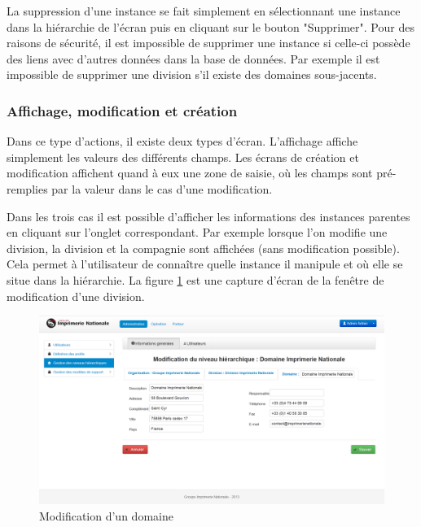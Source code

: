 La suppression d'une instance se fait simplement en sélectionnant une instance dans la hiérarchie de l'écran puis en cliquant sur le bouton "Supprimer".
Pour des raisons de sécurité, il est impossible de supprimer une instance si celle-ci possède des liens avec d'autres données dans la base de données.
Par exemple il est impossible de supprimer une division s'il existe des domaines sous-jacents.


\subsubsection{Affichage, modification et création}

Dans ce type d'actions, il existe deux types d'écran.
L'affichage affiche simplement les valeurs des différents champs.
Les écrans de création et modification affichent quand à eux une zone de saisie, où les champs sont pré-remplies par la valeur dans le cas d'une modification.

Dans les trois cas il est possible d'afficher les informations des instances parentes en cliquant sur l'onglet correspondant.
Par exemple lorsque l'on modifie une division, la division et la compagnie sont affichées (sans modification possible).
Cela permet à l'utilisateur de connaître quelle instance il manipule et où elle se situe dans la hiérarchie.
La figure \ref{instances_modification} est une capture d'écran de la fenêtre de modification d'une division.
\begin{figure}[!h]
	\center
	\includegraphics[width=1\textwidth]{img/instances_modification.png}
	\caption{Modification d'un domaine}
	\label{instances_modification}
\end{figure}


